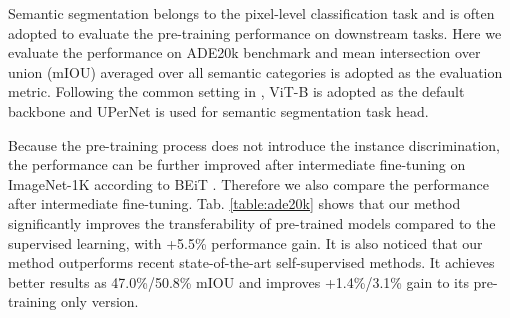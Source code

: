 \documentclass[runningheads]{llncs}
\begin{document}
Semantic segmentation belongs to the pixel-level classification task and is often adopted to evaluate the pre-training performance on downstream tasks. Here we evaluate the performance on ADE20k \cite{ade20k} benchmark and mean intersection over union (mIOU) averaged over all semantic categories is adopted as the evaluation metric. Following the common setting in \cite{beit,ibot}, ViT-B is adopted as the default backbone and UPerNet \cite{upernet} is used for semantic segmentation task head.

\begin{table}[t]

\small
\centering
\caption{Results of semantic segmentation on ADE20K. Intermediate fine-tuning denotes the pre-trained model has been fine-tuned on ImageNet-1K classification. 
}
\label{table:ade20k}
\end{table}


Because the pre-training process does not introduce the instance discrimination, the performance can be further improved after intermediate fine-tuning on ImageNet-1K according to BEiT \cite{beit}. Therefore we also compare the performance after intermediate fine-tuning. Tab. \ref{table:ade20k} shows that our method significantly improves the transferability of pre-trained models compared to the supervised learning, with +5.5\% performance gain. It is also noticed that our method outperforms recent state-of-the-art self-supervised methods. It achieves better results as 47.0\%/50.8\% mIOU and improves +1.4\%/3.1\% gain to its pre-training only version.
\end{document}
